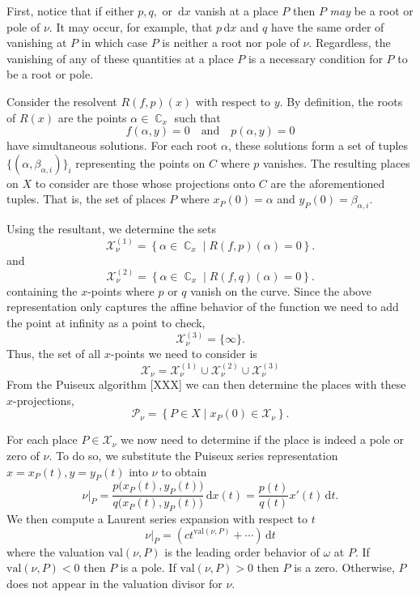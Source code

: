 \documentclass[12pt]{article}
\theoremstyle{definition}
\DeclareMathOperator{\CC}{\mathbb{C}}
\newcommand{\dx}{\,\mathrm{d}x}
\newcommand{\dt}{\,\mathrm{d}t}
\begin{document}
First, notice that if either $p,q,$ or $\dx$ vanish at a place $P$ then
$P$ {\it may} be a root or pole of $\nu$. It may occur, for example,
that $p \dx$ and $q$ have the same order of vanishing at $P$ in which
case $P$ is neither a root nor pole of $\nu$. Regardless, the vanishing
of any of these quantities at a place $P$ is a necessary condition for
$P$ to be a root or pole.

Consider the resolvent $R(f,p)(x)$ with respect to $y$. By definition,
the roots of $R(x)$ are the points $\alpha \in \CC_x$ such that
\[
f(\alpha,y) = 0 \quad \text{and} \quad p(\alpha, y) = 0
\]
have simultaneous solutions. For each root $\alpha$, these solutions
form a set of tuples $\{(\alpha,\beta_{\alpha,i})\}_i$ representing the
points on $C$ where $p$ vanishes. The resulting places on $X$ to
consider are those whose projections onto $C$ are the aforementioned
tuples. That is, the set of places $P$ where $x_P(0) = \alpha$ and
$y_P(0) = \beta_{\alpha,i}$.

Using the resultant, we determine the sets
\[
\mathcal{X}_\nu^{(1)} =
\left\{
\alpha \in \CC_x \; | \; R(f,p)(\alpha) = 0
\right\}.
\]
and
\[
\mathcal{X}_\nu^{(2)} =
\left\{
\alpha \in \CC_x \; | \; R(f,q)(\alpha) = 0
\right\}.
\]
containing the $x$-points where $p$ or $q$ vanish on the curve. Since
the above representation only captures the affine behavior of the
function we need to add the point at infinity as a point to check,
\[
\mathcal{X}_\nu^{(3)} = \{ \infty \}.
\]
Thus, the set of all $x$-points we need to consider is
\[
\mathcal{X}_\nu
=
\mathcal{X}_\nu^{(1)} \cup
\mathcal{X}_\nu^{(2)} \cup
\mathcal{X}_\nu^{(3)}
\]
From the Puiseux algorithm [XXX] we can then determine the places with
these $x$-projections,
\[
\mathcal{P}_\nu =
\left\{ P \in X \; | \; x_P(0) \in \mathcal{X}_\nu
\right\}.
\]

For each place $P \in \mathcal{X}_\nu$ we now need to determine if the
place is indeed a pole or zero of $\nu$. To do so, we substitute the
Puiseux series representation $x=x_P(t), y=y_P(t)$ into $\nu$ to obtain
\[
\nu \big|_P
=
\frac{p\big(x_P(t),y_P(t)\big)}{q\big(x_P(t),y_P(t)\big)} \dx(t)
=
\frac{p(t)}{q(t)} x'(t) \dt.
\]
We then compute a Laurent series expansion with respect to $t$
\[
\nu \big|_P = \left( c t^{\text{val}(\nu,P)} + \cdots \right) \dt
\]
where the valuation $\text{val}(\nu,P)$ is the leading order behavior of
$\omega$ at $P$. If $\text{val}(\nu,P) < 0$ then $P$ is a pole. If
$\text{val}(\nu,P) > 0$ then $P$ is a zero. Otherwise, $P$ does not
appear in the valuation divisor for $\nu$.
\end{document}
